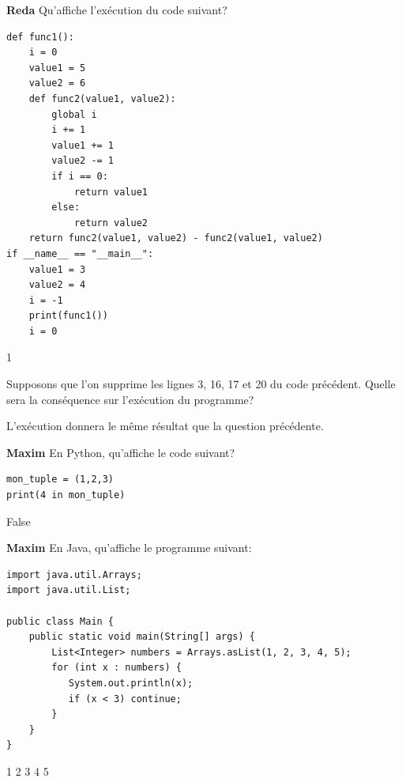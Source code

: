 \begin{Exercice}[5 minutes]\textbf{Reda}
Qu'affiche l'exécution du code suivant?
\begin{lstlisting}[style=pythonstyle]
def func1():
    i = 0
    value1 = 5
    value2 = 6
    def func2(value1, value2):
        global i
        i += 1
        value1 += 1
        value2 -= 1
        if i == 0:
            return value1
        else:
            return value2
    return func2(value1, value2) - func2(value1, value2)
if __name__ == "__main__":
    value1 = 3
    value2 = 4
    i = -1
    print(func1())
    i = 0
\end{lstlisting}


\begin{solution}
1
\end{solution}

Supposons que l’on supprime les lignes 3, 16, 17 et 20 du code précédent.
Quelle sera la conséquence sur l’exécution du programme?


\begin{solution}
L’exécution donnera le même résultat que la question précédente.
\end{solution}
\end{Exercice}

\begin{Exercice}[5 minutes]\textbf{Maxim}
En Python, qu'affiche le code suivant?
\begin{lstlisting}[style=pythonstyle]
mon_tuple = (1,2,3)
print(4 in mon_tuple)
\end{lstlisting}


\begin{solution}
False
\end{solution}
\end{Exercice}
\begin{Exercice}[5 minutes]\textbf{Maxim}
En Java, qu'affiche le programme suivant:

\begin{lstlisting}[style=javastyle]
import java.util.Arrays;
import java.util.List;

public class Main {
    public static void main(String[] args) {
        List<Integer> numbers = Arrays.asList(1, 2, 3, 4, 5);
        for (int x : numbers) {
           System.out.println(x);
           if (x < 3) continue;        
        }
    }
}
\end{lstlisting}
 

\begin{solution}
1 2 3 4 5
\end{solution}

\end{Exercice}


